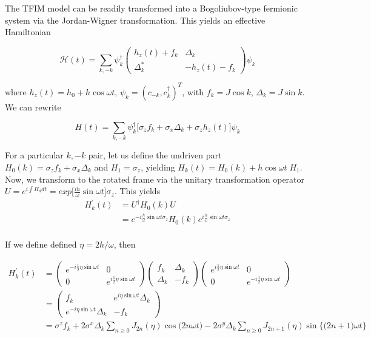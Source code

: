 \documentclass[%
 reprint,
 amsmath,amssymb,
 aps,
]{revtex4-2}
\begin{document}
The TFIM model can be readily transformed into a Bogoliubov-type fermionic system via the Jordan-Wigner transformation. This yields an effective Hamiltonian ~\cite{mbeng_quantum_2020}

\begin{equation*}
	\mathcal{H}(t)=\sum_{{k, -k}} \psi_{{k}}^{\dagger}\left(\begin{array}{cc}
		h_{z}(t)+f_{{k}} & \Delta_{{k}} \\
		\Delta_{{k}}^{*} & -h_{z}(t)-f_{{k}}
	\end{array}\right) \psi_{{k}}
\end{equation*}

where $h_z(t) = h_0 + h\cos{\omega t}$, $\psi_k = (c_{-k}, c^\dagger_k)^T$, with $f_k = J\cos{k}$, $\Delta_k = J\sin{k}$. We can rewrite

\begin{equation}
	H(t) = \sum_{k,-k} \psi^\dagger_k
	\Big[\sigma_z f_k + \sigma_x \Delta_k + \sigma_z h_z(t)\Big]\psi_k
\end{equation}

For a particular $k,-k$ pair, let us define the undriven part $H_0(k) = \sigma_z f_k + \sigma_x \Delta_k$ and $H_1 = \sigma_z$, yielding 
$H_k(t) = H_0(k) + h\cos{\omega t}\; H_1$. Now, we transform to the rotated frame via the unitary transformation operator $U = e^{i\int H_d d t} = exp \Big[\frac{i h}{\omega}\sin{\omega t}\Big]\sigma_z$. This yields
\begin{align*}
	H^\prime_k(t) &= U^\dagger H_0(k) U \\
	&=e^{-i\frac{h}{\omega}\sin{\omega t}\sigma_z} H_0(k) e^{i\frac{h}{\omega}\sin{\omega t}\sigma_z}\\
\end{align*}


If we define defined $\eta=2h/\omega$, then
\begin{widetext}
\begin{align}
	H^\prime_k(t) &= \begin{pmatrix}e^{-i\frac12\eta\sin{\omega t}}&0\\0&e^{i\frac12\eta\sin{\omega t}}\end{pmatrix} \begin{pmatrix}f_k&\Delta_k\\\Delta_k &-f_k\end{pmatrix}\begin{pmatrix}e^{i\frac12\eta\sin{\omega t}}&0\\0&e^{-i\frac12\eta\sin{\omega t}}\end{pmatrix}\nonumber \\
	&= \begin{pmatrix}f_k&e^{i\eta\sin{\omega t}}\Delta_k\\e^{-i\eta\sin{\omega t}}\Delta_k&-f_k\end{pmatrix}\nonumber \\
	&=  \sigma^z f_k + 2\sigma^x \Delta_k \sum_{n\geq 0} J_{2n}(\eta)\cos{\big(2n\omega t\big)} - 2\sigma^y\Delta_k \sum_{n\geq 0} J_{2n+1}(\eta)\sin{\big\{\big(2n+1\big)\omega t\big\}}
\end{align}
\end{widetext}
\end{document}
